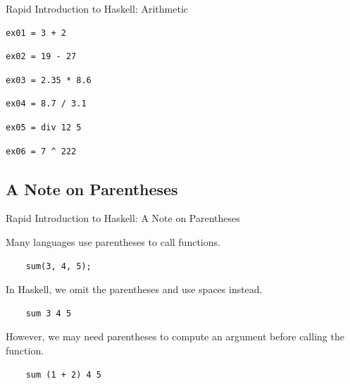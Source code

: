 \documentclass[8pt,aspectratio=169]{beamer}
\begin{document}
\begin{frame}[fragile]{Rapid Introduction to Haskell: Arithmetic}

\pause
\begin{verbatim}
ex01 = 3 + 2
\end{verbatim}

\pause
\begin{verbatim}
ex02 = 19 - 27
\end{verbatim}

\pause
\begin{verbatim}
ex03 = 2.35 * 8.6
\end{verbatim}

\pause
\begin{verbatim}
ex04 = 8.7 / 3.1
\end{verbatim}

\pause
\begin{verbatim}
ex05 = div 12 5
\end{verbatim}

\pause
\begin{verbatim}
ex06 = 7 ^ 222
\end{verbatim}

\end{frame}


\subsection{A Note on Parentheses}


\begin{frame}[fragile]{Rapid Introduction to Haskell: A Note on Parentheses}

\pause
Many languages use parentheses to call functions.

\pause
\begin{verbatim}
    sum(3, 4, 5);
\end{verbatim}

\vspace{5mm}

\pause
In Haskell, we omit the parentheses and use spaces instead.

\pause
\begin{verbatim}
    sum 3 4 5
\end{verbatim}

\vspace{5mm}

\pause
However, we may need parentheses to compute an argument before calling the function.

\pause
\begin{verbatim}
    sum (1 + 2) 4 5
\end{verbatim}

\end{frame}
\end{document}
